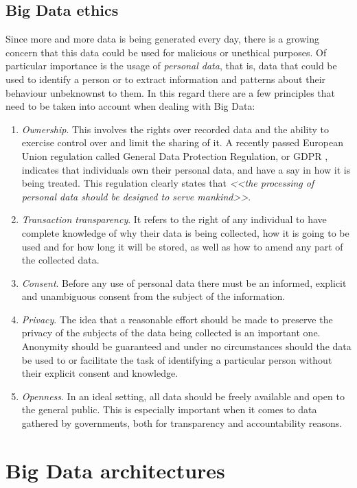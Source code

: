 \subsection{Big Data ethics}

Since more and more data is being generated every day, there is a growing concern that this data could be used for malicious or unethical purposes. Of particular importance is the usage of \textit{personal data}, that is, data that could be used to identify a person or to extract information and patterns about their behaviour unbeknownst to them. In this regard there are a few principles that need to be taken into account when dealing with Big Data:

\begin{enumerate}[1.]
  \item \textit{Ownership}. This involves the rights over recorded data and the ability to exercise control over and limit the sharing of it. A recently passed European Union regulation called General Data Protection Regulation, or GDPR \cite{eu2016gdpr}, indicates that individuals own their personal data, and have a say in how it is being treated. This regulation clearly states that \textit{<<the processing of personal data should be designed to serve mankind>>}.
  \item \textit{Transaction transparency}. It refers to the right of any individual to have complete knowledge of why their data is being collected, how it is going to be used and for how long it will be stored, as well as how to amend any part of the collected data.
  \item \textit{Consent}. Before any use of personal data there must be an informed, explicit and unambiguous consent from the subject of the information.
  \item \textit{Privacy}. The idea that a reasonable effort should be made to preserve the privacy of the subjects of the data being collected is an important one. Anonymity should be guaranteed and under no circumstances should the data be used to or facilitate the task of identifying a particular person without their explicit consent and knowledge.
  \item \textit{Openness}. In an ideal setting, all data should be freely available and open to the general public. This is especially important when it comes to data gathered by governments, both for transparency and accountability reasons.
\end{enumerate}

\section{Big Data architectures}

